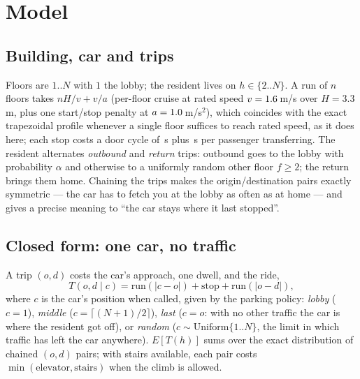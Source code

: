 \section{Model}
\label{sec:model}

\subsection{Building, car and trips}
Floors are $1..N$ with $1$ the lobby; the resident lives on $h \in \{2..N\}$.
A run of $n$ floors takes $n H / v + v / a$ (per-floor cruise at rated speed
$v = 1.6$\,m/s over $H = 3.3$\,m, plus one start/stop penalty at $a =
1.0$\,m/s$^2$), which coincides with the exact trapezoidal profile whenever a
single floor suffices to reach rated speed, as it does here; each stop costs a
door cycle of \KinDoor\,s plus \KinPass\,s per passenger transferring. The
resident alternates \emph{outbound} and \emph{return} trips: outbound goes to
the lobby with probability $\alpha$ and otherwise to a uniformly random other
floor $f \ge 2$; the return brings them home. Chaining the trips makes the
origin/destination pairs exactly symmetric --- the car has to fetch you at the
lobby as often as at home --- and gives a precise meaning to ``the car stays
where it last stopped''.

\subsection{Closed form: one car, no traffic}
A trip $(o, d)$ costs the car's approach, one dwell, and the ride,
\begin{equation}
T(o, d \mid c) = \text{run}(|c - o|) + \text{stop} + \text{run}(|o - d|),
\end{equation}
where $c$ is the car's position when called, given by the parking policy:
\emph{lobby} ($c = 1$), \emph{middle} ($c = \lceil (N+1)/2 \rceil$),
\emph{last} ($c = o$: with no other traffic the car is where the resident
got off), or \emph{random} ($c \sim \text{Uniform}\{1..N\}$, the limit in
which traffic has left the car anywhere). $E[T(h)]$ sums over the exact
distribution of chained $(o, d)$ pairs; with stairs available, each pair
costs $\min(\text{elevator}, \text{stairs})$ when the climb is allowed.

